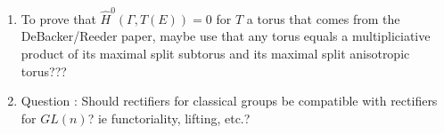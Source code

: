 \documentclass{article}
\begin{document}
\begin{enumerate}
\item To prove that $\hat{H}^0(\Gamma, T(E)) = 0$ for $T$ a torus that comes from the DeBacker/Reeder paper, maybe use that any torus equals a multipliciative product of its maximal split subtorus and its maximal split anisotropic torus???

\item Question : Should rectifiers for classical groups be compatible with rectifiers for $GL(n)$? ie functoriality, lifting, etc.?


\end{enumerate}
\end{document}
